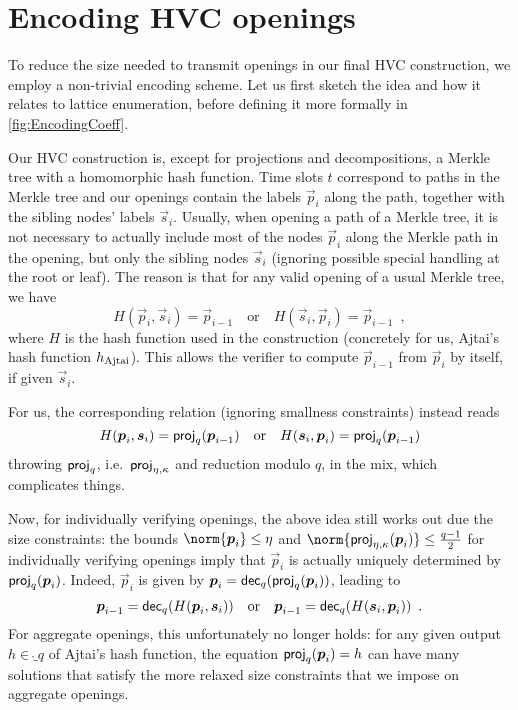 \section{Encoding HVC openings}\label{sect:efficientencoding}



To reduce the size needed to transmit openings in our final HVC construction, we employ a non-trivial encoding scheme.
Let us first sketch the idea and how it relates to lattice enumeration, before defining it more formally in \autoref{fig:EncodingCoeff}.

Our HVC construction is, except for projections and decompositions, a Merkle tree with a homomorphic hash function.
Time slots $t$ correspond to paths in the Merkle tree and our openings contain the labels $\vec{p}_i$ along the path, together with the sibling nodes' labels $\vec{s}_i$.
Usually, when opening a path of a Merkle tree, it is not necessary to actually include most of the nodes $\vec{p}_i$ along the Merkle path in the opening, but only the sibling nodes $\vec{s}_i$ (ignoring possible special handling at the root or leaf).
The reason is that for any valid opening of a usual Merkle tree, we have 
\[
 H(\vec{p}_i,\vec{s}_i) = \vec{p}_{i-1} \quad\text{or}\quad H(\vec{s}_i,\vec{p}_i) = \vec{p}_{i-1}\enspace, 
\]
where $H$ is the hash function used in the construction (concretely for us, Ajtai's hash function $h_\mathrm{Ajtai}$).
This allows the verifier to compute $\vec{p}_{i-1}$ from $\vec{p}_{i}$ by itself, if given $\vec{s}_i$.

For us, the corresponding relation (ignoring smallness constraints) instead reads
\[
 H(\boldsymbol{p}_i,\boldsymbol{s}_i) =  \mathsf{proj}_{q}(\boldsymbol{p}_{i-1})  \quad\text{or}\quad H(\boldsymbol{s}_i,\boldsymbol{p}_i) = \mathsf{proj}_{q}(\boldsymbol{p}_{i-1})
\]
throwing $\mathsf{proj}_{q}$, i.e.\ $\mathsf{proj}_{\eta,\kappa}$ and reduction modulo $q$, in the mix, which complicates things.

Now, for individually verifying openings, the above idea still works out due the size constraints:
the bounds $\norm{\vec{p}_i} \leq \eta$ and $\norm{\projring(\vec{p}_i)}\leq \tfrac{q-1}{2}$ for individually verifying openings imply that $\vec{p}_i$ is actually uniquely determined by $\mathsf{proj}_{q}(\boldsymbol{p}_i)$.
Indeed, $\vec{p}_i$ is given by $\boldsymbol{p}_i = \mathsf{dec}_{q}(\mathsf{proj}_{q}(\boldsymbol{p}_i))$, leading to
\[
 \boldsymbol{p}_{i-1} = \mathsf{dec}_{q}(H(\boldsymbol{p}_i,\boldsymbol{s}_i))\quad\text{or}\quad \boldsymbol{p}_{i-1} = \mathsf{dec}_{q}(H(\boldsymbol{s}_i,\boldsymbol{p}_i))\enspace.
\]
For aggregate openings, this unfortunately no longer holds:
for any given output $h\in\ring_q$ of Ajtai's hash function, the equation $\mathsf{proj}_{q}(\boldsymbol{p}_i) = h$ can have many solutions
that satisfy the more relaxed size constraints that we impose on aggregate openings.


